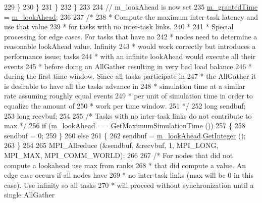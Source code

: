 \begin{DoxyCode}
229                 \}
230             \}
231         \}
232     \}
233 
234   \textcolor{comment}{// m\_lookAhead is now set}
235   \hyperlink{classns3_1_1DistributedSimulatorImpl_a2b793ea16a0f2e786742813d2bcdc2f4}{m\_grantedTime} = \hyperlink{classns3_1_1DistributedSimulatorImpl_af223a2f60c7b91af0b12ba7ba174a47e}{m\_lookAhead};
236 
237   \textcolor{comment}{/*}
238 \textcolor{comment}{   * Compute the maximum inter-task latency and use that value}
239 \textcolor{comment}{   * for tasks with no inter-task links.}
240 \textcolor{comment}{   *}
241 \textcolor{comment}{   * Special processing for edge cases.  For tasks that have no}
242 \textcolor{comment}{   * nodes need to determine a reasonable lookAhead value.  Infinity}
243 \textcolor{comment}{   * would work correctly but introduces a performance issue; tasks}
244 \textcolor{comment}{   * with an infinite lookAhead would execute all their events}
245 \textcolor{comment}{   * before doing an AllGather resulting in very bad load balance}
246 \textcolor{comment}{   * during the first time window.  Since all tasks participate in}
247 \textcolor{comment}{   * the AllGather it is desirable to have all the tasks advance in}
248 \textcolor{comment}{   * simulation time at a similar rate assuming roughly equal events}
249 \textcolor{comment}{   * per unit of simulation time in order to equalize the amount of}
250 \textcolor{comment}{   * work per time window.}
251 \textcolor{comment}{   */}
252   \textcolor{keywordtype}{long} sendbuf;
253   \textcolor{keywordtype}{long} recvbuf;
254 
255   \textcolor{comment}{/* Tasks with no inter-task links do not contribute to max */}
256   \textcolor{keywordflow}{if} (\hyperlink{classns3_1_1DistributedSimulatorImpl_af223a2f60c7b91af0b12ba7ba174a47e}{m\_lookAhead} == \hyperlink{classns3_1_1DistributedSimulatorImpl_a09879f4ab9e765716a96b40900be4480}{GetMaximumSimulationTime} ())
257     \{
258       sendbuf = 0;
259     \}
260   \textcolor{keywordflow}{else}
261     \{
262       sendbuf  = \hyperlink{classns3_1_1DistributedSimulatorImpl_af223a2f60c7b91af0b12ba7ba174a47e}{m\_lookAhead}.\hyperlink{classns3_1_1Time_a8c88e10860be3bc0cfabdbd92df42cff}{GetInteger} ();
263     \}
264 
265   MPI\_Allreduce (&sendbuf, &recvbuf, 1, MPI\_LONG, MPI\_MAX, MPI\_COMM\_WORLD);
266 
267   \textcolor{comment}{/* For nodes that did not compute a lookahead use max from ranks}
268 \textcolor{comment}{   * that did compute a value.  An edge case occurs if all nodes have}
269 \textcolor{comment}{   * no inter-task links (max will be 0 in this case). Use infinity so all tasks}
270 \textcolor{comment}{   * will proceed without synchronization until a single AllGather}

\end{DoxyCode}
